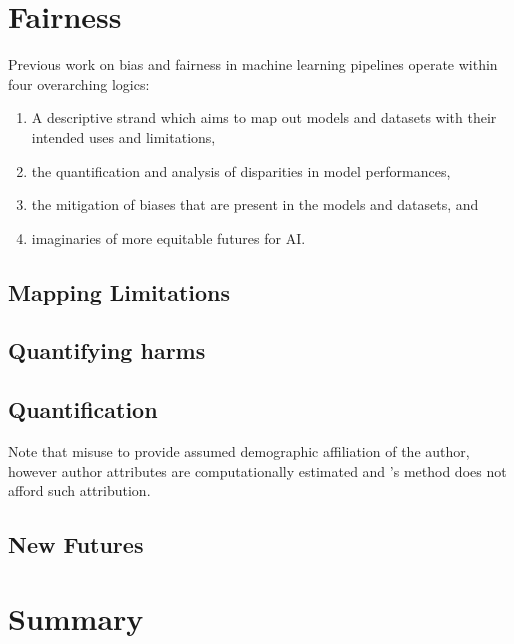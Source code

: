 
\section{Fairness}\label{sec:fairlitt}

Previous work on bias and fairness in machine learning pipelines operate within four overarching logics:

\begin{enumerate}
  \item{A descriptive strand which aims to map out models and datasets with their intended uses and limitations, }
  \item{the quantification and analysis of disparities in model performances,}
  \item{the mitigation of biases that are present in the models and datasets, and}
  \item{imaginaries of more equitable futures for AI.}
\end{enumerate}

\subsection{Mapping Limitations}

\cite{Mitchell:2019}
\cite{Bender-Friedman:2018}
\cite{Hovy-Spruit:2016}
\cite{Blodget:2020}
\cite{Holstein:2019}

\subsection{Quantifying harms}
\cite{Buolamwini:2018}
\cite{Kulynych:2020}
\cite{Shah:2020}
\cite{Vanmassenhove:2018}
\cite{Waseem:2016}
\cite{Derzynski:2016}
\cite{Birhane:2020}

\subsection{Quantification}
\cite{Agarwal:2018}
\cite{Romanov:2019}
Note that \cite{Sap:2019} misuse \cite{Blodgett:2016} to provide assumed demographic affiliation of the author, however author attributes are computationally estimated and \cite{Blodgett:2016}'s method does not afford such attribution.
\cite{Davidson:2019}
\cite{Zhao:2017}

\subsection{New Futures}

\cite{Yimam-Biemann:2018}
\cite{Bingel:2018}
\cite{Kalluri:2019}

\section{Summary}
